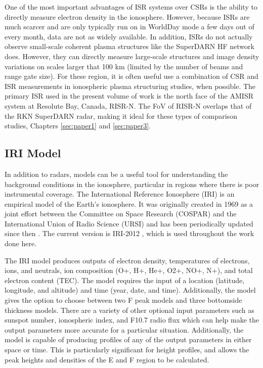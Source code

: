 One of the most important advantages of ISR systems over CSRs is the ability to directly measure electron density in the ionosphere.  However, because ISRs are much scarcer and are only typically run on in WorldDay mode a few days out of every month, data are not as widely available.  In addition, ISRs do not actually observe small-scale coherent plasma structures like the SuperDARN HF network does.  However, they can directly measure large-scale structures and image density variations on scales larger that 100 km (limited by the number of beams and range gate size).  For these region, it is often useful use a combination of CSR and ISR measurements in ionospheric plasma structuring studies, when possible.  The primary ISR used in the present volume of work is the north face of the AMISR system at Resolute Bay, Canada, RISR-N.  The FoV of RISR-N overlaps that of the RKN SuperDARN radar, making it ideal for these types of comparison studies, Chapters \ref{sec:paper1} and \ref{sec:paper3}.

\subsection{IRI Model}
\label{sec:iri}
In addition to radars, models can be a useful tool for understanding the background conditions in the ionosphere, particular in regions where there is poor instrumental coverage.  The International Reference Ionosphere (IRI) is an empirical model of the Earth's ionosphere.  It was originally created in 1969 as a joint effort between the Committee on Space Research (COSPAR) and the International Union of Radio Science (URSI) and has been periodically updated since then \citep{Rawer1975,Rawer1978,Rawer1981,Bilitza1985,Bilitza1986,Bilitza1990,Bilitza1997,Bilitza2001,Bilitza2008}.  The current version is IRI-2012 \citep{Bilitza2014}, which is used throughout the work done here.

The IRI model produces outputs of electron density, temperatures of electrons, ions, and neutrals, ion composition (O+, H+, He+, O2+, NO+, N+), and total electron content (TEC).  The model requires the input of a location (latitude, longitude, and altitude) and time (year, date, and time).  Additionally, the model gives the option to choose between two F peak models and three bottomside thickness models.  There are a variety of other optional input parameters such as sunspot number, ionospheric index, and F10.7 radio flux which can help make the output parameters more accurate for a particular situation.  Additionally, the model is capable of producing profiles of any of the output parameters in either space or time.  This is particularly significant for height profiles, and allows the peak heights and densities of the E and F region to be calculated.

